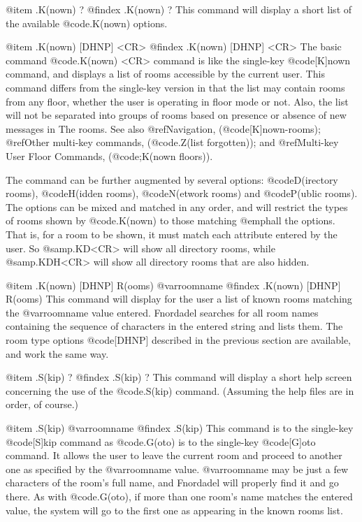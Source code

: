 @item .K(nown) ?
@findex .K(nown) ?
This command will display a short list of the available
@code{.K(nown)} options.

@item .K(nown) [DHNP] <CR>
@findex .K(nown) [DHNP] <CR>
The basic command @code{.K(nown) <CR>} command is like the single-key
@code{[K]nown} command, and displays a list of rooms accessible by
the current user.  This command differs from the single-key version in
that the list may contain rooms from any floor, whether the user is
operating in floor mode or not.  Also, the list will not be separated
into groups of rooms based on presence or absence of new messages in
The rooms.  See also @ref{Navigation}, (@code{[K]nown-rooms});
@ref{Other multi-key commands}, (@code{.Z(list forgotten)});
and @ref{Multi-key User Floor Commands}, (@code{;K(nown floors)}).

The command can be further augmented by several options:
@code{D(irectory rooms)}, @code{H(idden rooms)}, @code{N(etwork rooms)} and
@code{P(ublic rooms)}.
The options can be mixed and matched in any order, and will restrict
the types of rooms shown by @code{.K(nown)} to those matching @emph{all} the options.
That is, for a room to be shown, it must match each attribute entered
by the user.  So @samp{.KD<CR>} will show all directory rooms, while @samp{.KDH<CR>}
will show all directory rooms that are also hidden.

@item .K(nown) [DHNP] R(ooms) @var{roomname}
@findex .K(nown) [DHNP] R(ooms)
This command will display for the user a list of known rooms
matching the @var{roomname} value entered.  Fnordadel searches for all
room names containing the sequence of characters in the entered string
and lists them.  The room type options @code{[DHNP]} described in the
previous section are available, and work the same way.

@item .S(kip) ?
@findex .S(kip) ?
This command will display a short help screen concerning the
use of the @code{.S(kip)} command.  (Assuming the help files are in order,
of course.)

@item .S(kip) @var{roomname}
@findex .S(kip)
This command is to the single-key @code{[S]kip} command as @code{.G(oto)}
is to the single-key @code{[G]oto} command.  It allows the user to leave the
current room and proceed to another one as specified by the @var{roomname}
value.  @var{roomname} may be just a few characters of the room's full
name, and Fnordadel will properly find it and go there.  As with
@code{.G(oto)}, if more than one room's name matches the entered value, the
system will go to the first one as appearing in the known rooms list.

